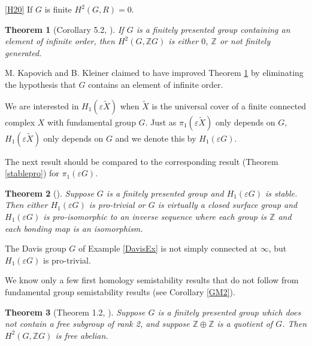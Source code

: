 \documentclass[12pt]{article}
\newtheorem{theorem}{Theorem}[subsection]
\begin{document}
\medskip

 \ref{H20} If $G$ is finite $H^2(G,R)=0$.


\begin{theorem} [Corollary 5.2, \cite{FFT}] \label{FFT1} 
If $G$ is a finitely presented group containing an element of infinite order, then $H^2(G,\mathbb ZG)$ is either $0$, $ \mathbb Z$ or not finitely generated. 
\end{theorem}  

 M. Kapovich and B. Kleiner claimed to have improved Theorem \ref{FFT1} by eliminating the hypothesis that $G$ contains an element of infinite order.  
 
 \medskip
 
We are interested in $H_1(\varepsilon \tilde X)$ when $\tilde X$ is the universal cover of a finite connected complex $X$ with fundamental group $G$. Just as  $\pi_1(\varepsilon \tilde X)$ only depends on $G$, $H_1(\varepsilon \tilde X)$ only depends on $G$ and we denote this by $H_1(\varepsilon G)$.

The next result should be compared to the corresponding result (Theorem \ref{stablepro}) for $\pi_1(\varepsilon G)$. 

\begin{theorem}[\cite{Bo04}] \label{stableproH}   Suppose $G$ is a finitely presented group and $H_1(\varepsilon G)$ is stable. Then either $H_1(\varepsilon G)$ is pro-trivial or $G$ is virtually a closed surface group and $H_1(\varepsilon G)$ is pro-isomorphic to an inverse sequence where each group is $\mathbb Z$ and each bonding map is an isomorphism.
\end{theorem} 

The Davis group $G$ of Example \ref{DavisEx}  is not simply connected at $\infty$, but $H_1(\varepsilon G)$ is pro-trivial. 

We know only a few first homology semistability results that do not follow from fundamental group semistability results (see Corollary \ref{GM2}).

\begin{theorem} [Theorem 1.2, \cite{GM85}] Suppose $G$ is a finitely presented group which does not contain a free subgroup of rank 2, and suppose $\mathbb Z\oplus\mathbb Z$ is a quotient of $G$. Then $H^2(G,\mathbb ZG)$ is free abelian.
\end{theorem}
 
 
\end{document}
